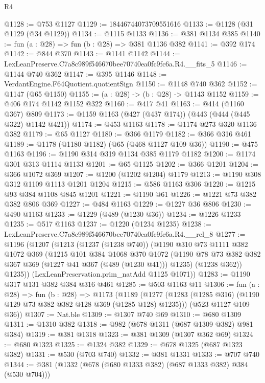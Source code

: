\begin{lexlean}{R4}
\begin{coremodule}
@1128 := @753 @1127
@1129 := 18446744073709551616
@1133 := @1128 (@31 @1129 (@34 @1129))
@1134 := @1115 @1133
@1136 := @381 @1134 @385
@1140 := fun (a : @28) => fun (b : @28) => @381 @1136 @382
@1141 := @392 @174
@1142 := @844 @370
@1143 := @1141 @1142
@1144 := LexLeanPreserve.C7a8c989f546670bee70740ea0fc9fc6a.R4.__fits_5
@1146 := @1144 @740 @362
@1147 := @395 @1146
@1148 := VerdantEngine.F64Quotient.quotientSign
@1150 := @1148 @740 @362
@1152 := @1147 (@65 @1150)
@1155 := (a : @28) -> (b : @28) -> @1143 @1152
@1159 := @406 @174 @1142 @1152 @322
@1160 := @417 @41
@1163 := @414 (@1160 @367) @809
@1173 := @1159 @1163 (@427 (@437 @174)) (@443 (@444 (@445 @322) @1142 @421))
@1174 := @453 @1163
@1178 := @1174 @273 @320 @1136 @382
@1179 := @65 @1127
@1180 := @366 @1179
@1182 := @366 @316 @461
@1189 := @1178 (@1180 @1182) (@65 (@468 @1127 @109 @36))
@1190 := @475 @1163
@1196 := @1190 @314 @319 @1134 @385 @1179 @1182
@1200 := @1174 @301 @313 @1114 @1133
@1201 := @65 @1125
@1202 := @366 @1201
@1204 := @366 @1072 @369
@1207 := @1200 (@1202 @1204) @1179
@1213 := @1190 @308 @312 @1109 @1113 @1201 @1204
@1215 := @586 @1163 @306
@1220 := @1215 @93 @384 @1108 @845 @1201
@1221 := @1190 @61
@1226 := @1221 @73 @382 @382 @806 @369
@1227 := @484 @1163
@1229 := @1227 @36 @806
@1230 := @490 @1163
@1233 := @1229 (@489 (@1230 @36))
@1234 := @1226 @1233
@1235 := @517 @1163
@1237 := @1220 (@1234 @1235)
@1238 := LexLeanPreserve.C7a8c989f546670bee70740ea0fc9fc6a.R4.__rel_8
@1277 := @1196
    (@1207
      (@1213
        (@1237 (@1238 @740))
        (@1190
          @310
          @73
          @1111
          @382
          @1072
          @369
          (@1215
            @101
            @384
            @1068
            @370
            @1072
            (@1190 @78 @73 @382 @382 @367 @369 (@1227 @41 @367 (@489 (@1230 @41))) @1235)
            (@1238 @362))
          @1235))
      (LexLeanPreservation.prim_natAdd @1125 @1071))
@1283 := @1190 @317 @131 @382 @384 @316 @461
@1285 := @503 @1163 @11
@1306 := fun (a : @28) =>
  fun (b : @28) =>
  @1173
    (@1189
      (@1277 (@1283 (@1285 @316) (@1190 @129 @73 @382 @382 @128 @369 (@1285 @128) @1235)))
      (@523 @1127 @109 @36))
@1307 := Nat.ble
@1309 := @1307 @740 @69
@1310 := @680 @1309
@1311 := @1310 @382
@1318 := @982 (@678 @1311 (@687 @1309 @382) @981 @384)
@1319 := @381 @1318
@1323 := @381 @1309 (@1307 @362 @69)
@1324 := @680 @1323
@1325 := @1324 @382
@1329 := @678 @1325 (@687 @1323 @382)
@1331 := @530 (@703 @740)
@1332 := @381 @1331
@1333 := @707 @740
@1344 := @381 (@1332 (@678 (@680 @1333 @382) (@687 @1333 @382) @384 (@530 @704)))

\end{coremodule}
\end{lexlean}
